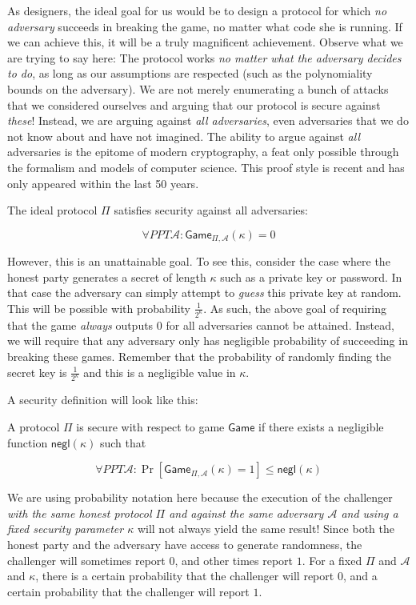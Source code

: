 As designers, the ideal goal for us would be to design a protocol for which \emph{no adversary}
succeeds in breaking the game, no matter what code she is running. If we can achieve this, it
will be a truly magnificent achievement. Observe what we are trying to say here: The protocol
works \emph{no matter what the adversary decides to do}, as long as our assumptions are respected
(such as the polynomiality bounds on the adversary).
We are not merely enumerating a bunch of attacks that we considered ourselves and arguing that
our protocol is secure against \emph{these}!
Instead, we are arguing against \emph{all adversaries}, even adversaries that we do
not know about and have not imagined. The ability to argue against \emph{all} adversaries is the
epitome of modern cryptography, a feat only possible through the
formalism and models of computer science. This proof style is recent and has only appeared within
the last 50 years.

The ideal protocol $\Pi$ satisfies security against all adversaries:

\[
  \forall PPT \mathcal{A}: \textsf{Game}_{\Pi,\mathcal{A}}(\kappa) = 0
\]

However, this is an unattainable goal. To see this, consider the case where the honest party
generates a secret of length $\kappa$ such as a private key or password. In that case the
adversary can simply attempt to \emph{guess} this private key at random. This will be possible
with probability $\frac{1}{2^\kappa}$. As such, the above goal of requiring that the game
\emph{always} outputs $0$ for all adversaries cannot be attained. Instead, we will require
that any adversary only has negligible probability of succeeding in breaking these games.
Remember that the probability of randomly finding the secret key is $\frac{1}{2^\kappa}$
and this is a negligible value in $\kappa$.

A security definition will look like this:

\begin{definition}[Security]
  A protocol $\Pi$ is secure with respect to game $\textsf{Game}$ if there exists a negligible
  function $\textsf{negl}(\kappa)$ such that

  \[
    \forall PPT \mathcal{A}: \Pr[\textsf{Game}_{\Pi,\mathcal{A}}(\kappa) = 1] \leq \textsf{negl}(\kappa)
  \]
\end{definition}

We are using probability notation here because the execution of the challenger \emph{with the
same honest protocol $\Pi$ and against the same adversary $\mathcal{A}$ and using a fixed security parameter
$\kappa$} will not always yield
the same result! Since both the honest party and the adversary have access to generate randomness,
the challenger will sometimes report $0$, and other times report $1$. For a fixed $\Pi$ and $\mathcal{A}$
and $\kappa$, there is a certain probability that the challenger will report $0$, and a certain
probability that the challenger will report $1$.

